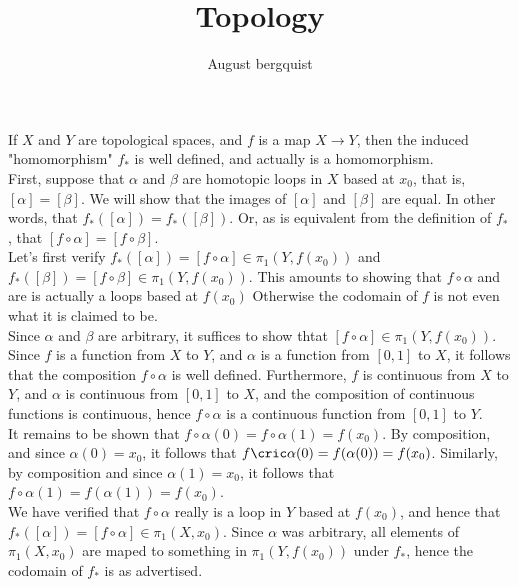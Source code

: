 \documentclass{article}
\title{Topology}
\author{August bergquist}
\begin{document}
\maketitle

 If $X$ and $Y$ are topological spaces, and $f$ is a map $X\rightarrow Y$, then the induced "homomorphism" $f_*$ is well defined, and actually is a homomorphism.\\

 First, suppose that $\alpha$ and $\beta$ are homotopic loops in $X$ based at $x_0$, that is, $[\alpha] = [\beta]$. We will show that the images of $[\alpha]$ and $[\beta]$ are equal. In other words, that $f_*([\alpha]) = f_*([\beta])$. Or, as is equivalent from the definition of $f_*$, that $[f\circ \alpha] = [f\circ \beta]$.\\

Let's first verify $f_*([\alpha]) = [f\circ\alpha]\in \pi_1(Y, f(x_0))$ and $f_*([\beta]) = [f\circ \beta]\in \pi_1(Y, f(x_0))$. This amounts to showing that $f\circ \alpha$ and are is actually a loops based at $f(x_0)$ Otherwise the codomain of $f$ is not even what it is claimed to be.\\

Since $\alpha$ and $\beta$ are arbitrary, it suffices to show thtat $[f\circ \alpha]\in \pi_1(Y, f(x_0))$. Since $f$ is a function from $X$ to $Y$, and $\alpha$ is a function from $[0,1]$ to $X$, it follows that the composition $f\circ\alpha$ is well defined. Furthermore, $f$ is continuous from $X$ to $Y$, and $\alpha$ is continuous from $[0,1]$ to $X$, and the composition of continuous functions is continuous, hence $f\circ \alpha$ is a continuous function from $[0,1]$ to $Y$. \\

It remains to be shown that $f\circ \alpha(0) = f\circ \alpha(1) = f(x_0)$. By composition, and since $\alpha(0) = x_0$, it follows that $f\cric\alpha(0) = f(\alpha(0)) = f(x_0)$. Similarly, by composition and since $\alpha(1) = x_0$, it follows that $f\circ \alpha(1) = f(\alpha(1)) = f(x_0)$.\\

We have verified that $f\circ\alpha$ really is a loop in $Y$ based at $f(x_0)$, and hence that $f_*([\alpha]) = [f\circ \alpha]\in \pi_1(X,x_0)$. Since $\alpha$ was arbitrary, all elements of $\pi_1(X,x_0)$ are maped to something in $\pi_1(Y, f(x_0))$ under $f_*$, hence the codomain of $f_*$ is as advertised.\\
\end{document}
